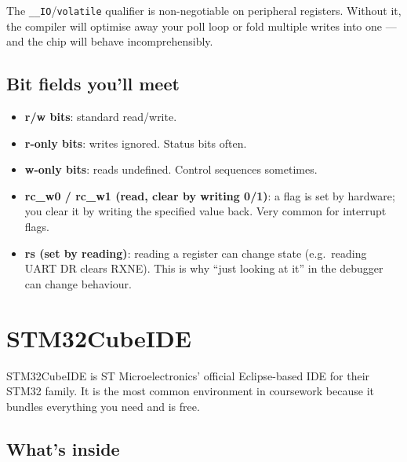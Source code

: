 \documentclass[11pt,a4paper]{article}
\begin{document}
\begin{keyidea}
The \texttt{\_\_IO}/\texttt{volatile} qualifier is non-negotiable on
peripheral registers. Without it, the compiler will optimise away your
poll loop or fold multiple writes into one --- and the chip will behave
incomprehensibly.
\end{keyidea}

\subsection{Bit fields you'll meet}

\begin{itemize}[leftmargin=*]
    \item \textbf{r/w bits}: standard read/write.
    \item \textbf{r-only bits}: writes ignored. Status bits often.
    \item \textbf{w-only bits}: reads undefined. Control sequences sometimes.
    \item \textbf{rc\_w0 / rc\_w1 (read, clear by writing 0/1)}: a flag is set
    by hardware; you clear it by writing the specified value back. Very
    common for interrupt flags.
    \item \textbf{rs (set by reading)}: reading a register can change state
    (e.g.\ reading UART DR clears RXNE). This is why ``just looking at it''
    in the debugger can change behaviour.
\end{itemize}

\section{STM32CubeIDE}

STM32CubeIDE is ST Microelectronics' official Eclipse-based IDE for their
STM32 family. It is the most common environment in coursework because it
bundles everything you need and is free.

\subsection{What's inside}
\end{document}
